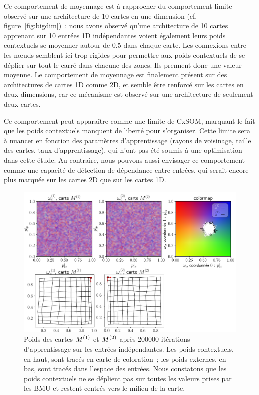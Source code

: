 \documentclass[../main]{subfiles}
\begin{document}
Ce comportement de moyennage est à rapprocher du comportement limite observé sur une architecture de 10 cartes en une dimension (cf. figure~\ref{fig:bigdim})~: nous avons observé qu'une architecture de 10 cartes apprenant sur 10 entrées 1D indépendantes voient également leurs poids contextuels se moyenner autour de $0.5$ dans chaque carte.
Les connexions entre les n\oe{}uds semblent ici trop rigides pour permettre aux poids contextuels de se déplier sur tout le carré dans chacune des zones. Ils prennent donc une valeur moyenne.
Le comportement de moyennage est finalement présent sur des architectures de cartes 1D comme 2D, et semble être renforcé sur les cartes en deux dimensions, car ce mécanisme est observé sur une architecture de seulement deux cartes.

Ce comportement peut apparaître comme une limite de CxSOM, marquant le fait que les poids contextuels manquent de liberté pour s'organiser. Cette limite sera à nuancer en fonction des paramètres d'apprentissage (rayons de voisinage, taille des cartes, taux d'apprentissage), qui n'ont pas été soumis à une optimisation dans cette étude.
Au contraire, nous pouvons aussi envisager ce comportement comme une capacité de détection de dépendance entre entrées, qui serait encore plus marquée sur les cartes 2D que sur les cartes 1D. 

\begin{figure}
	\centering\includegraphics[width=\textwidth]{w_cub_rc002.pdf}
	\caption{Poids des cartes $M^{({1})}$ et $M^{({2})}$ après 200000 itérations d'apprentissage sur les entrées indépendantes. Les poids contextuels, en haut, sont tracés en carte de coloration~; les poids externes, en bas, sont tracés dans l'espace des entrées.
	Nous constatons que les poids contextuels ne se déplient pas sur toutes les valeurs prises par les BMU et restent centrés vers le milieu de la carte. \label{fig:2som_cub_wc}}
\end{figure}
\end{document}
